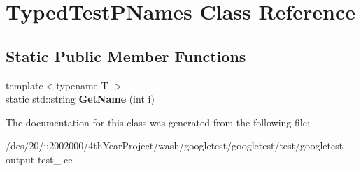 \hypertarget{classTypedTestPNames}{}\section{Typed\+Test\+P\+Names Class Reference}
\label{classTypedTestPNames}
\subsection*{Static Public Member Functions}
\begin{DoxyCompactItemize}
\item 
\mbox{\label{classTypedTestPNames_a26c9183af369e04ccaaa40fd2946d7c4}} 
{\footnotesize template$<$typename T $>$ }\\static std\+::string {\bfseries Get\+Name} (int i)
\end{DoxyCompactItemize}


The documentation for this class was generated from the following file\+:\begin{DoxyCompactItemize}
\item 
/dcs/20/u2002000/4th\+Year\+Project/wash/googletest/googletest/test/googletest-\/output-\/test\+\_\+.\+cc\end{DoxyCompactItemize}
